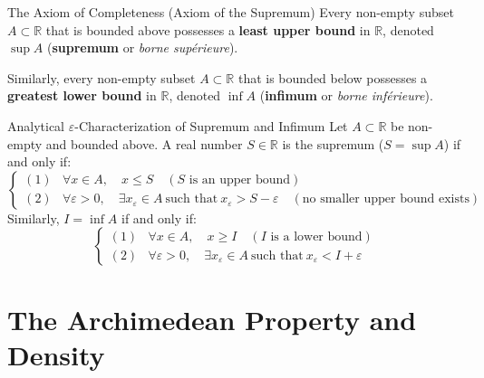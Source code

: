 \begin{theorembox}{The Axiom of Completeness (Axiom of the Supremum)}
Every non-empty subset $A \subset \mathbb{R}$ that is bounded above possesses a \textbf{least upper bound} in $\mathbb{R}$, denoted $\sup A$ (\textbf{supremum} or \textit{borne supérieure}).

Similarly, every non-empty subset $A \subset \mathbb{R}$ that is bounded below possesses a \textbf{greatest lower bound} in $\mathbb{R}$, denoted $\inf A$ (\textbf{infimum} or \textit{borne inférieure}).
\end{theorembox}

\begin{propbox}{Analytical $\varepsilon$-Characterization of Supremum and Infimum}
Let $A \subset \mathbb{R}$ be non-empty and bounded above. A real number $S \in \mathbb{R}$ is the supremum ($S = \sup A$) if and only if:
\begin{equation}
\begin{cases}
(1) & \forall x \in A, \quad x \le S \quad (\text{$S$ is an upper bound}) \\
(2) & \forall \varepsilon > 0, \quad \exists x_\varepsilon \in A \ \text{such that} \ x_\varepsilon > S - \varepsilon \quad (\text{no smaller upper bound exists})
\end{cases}
\end{equation}
Similarly, $I = \inf A$ if and only if:
\begin{equation}
\begin{cases}
(1) & \forall x \in A, \quad x \ge I \quad (\text{$I$ is a lower bound}) \\
(2) & \forall \varepsilon > 0, \quad \exists x_\varepsilon \in A \ \text{such that} \ x_\varepsilon < I + \varepsilon
\end{cases}
\end{equation}
\end{propbox}

\section{The Archimedean Property and Density}

